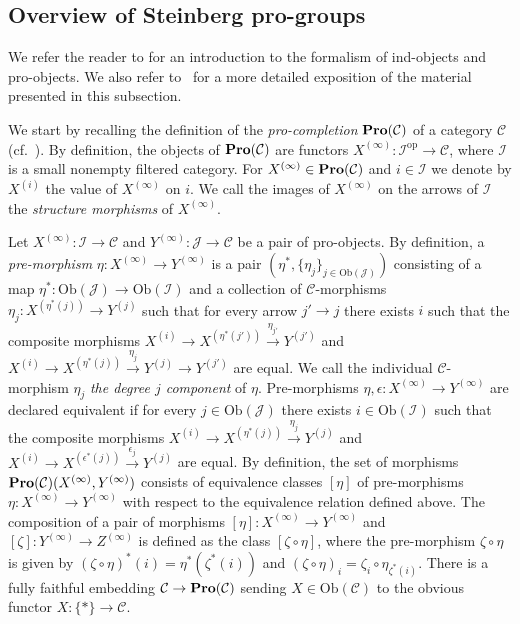 \documentclass[oneside, 11pt]{amsart} \pdfoutput=1
\numberwithin{equation}{section}
\theoremstyle{definition}
\newcommand{\catname}[1]{{\normalfont\textbf{#1}}} %
\begin{document}
\subsection{Overview of Steinberg pro-groups}
We refer the reader to \cite[Section~6.1]{SK06} for an introduction to the formalism of ind-objects and pro-objects. We also refer to~\cite[\S~2]{LSV20} for a more detailed exposition of the material presented in this subsection.

We start by recalling the definition of the {\it pro-completion} $\catname{Pro}(\mathcal{C})$ of a category $\mathcal{C}$ (cf.~\cite[\S~2.1]{LSV20}).
By definition, the objects of $\catname{Pro}(\mathcal{C})$ are functors $X^{(\infty)}\colon\mathcal{I}^{\mathrm{op}} \to \mathcal{C}$, where $\mathcal{I}$ is a small nonempty filtered category. For $X^{(\infty)} \in 
\catname{Pro}(\mathcal{C})$ and $i \in \mathcal{I}$ we denote by $X^{(i)}$ the value of $X^{(\infty)}$ on $i$. 
We call the images of $X^{(\infty)}$ on the arrows of $\mathcal{I}$ the {\it structure morphisms} of $X^{(\infty)}$.

Let $X^{(\infty)}\colon\mathcal{I}\to\mathcal{C}$ and $Y^{(\infty)}\colon\mathcal{J}\to\mathcal{C}$ be a pair of pro-objects.
By definition, a {\it pre-morphism} $\eta\colon X^{(\infty)} \to Y^{(\infty)}$ is a pair $(\eta^*, \{\eta_j\}_{j\in\mathrm{Ob}(\mathcal{J})})$ consisting of a map $\eta^*\colon \mathrm{Ob}(\mathcal{J})\to\mathrm{Ob}(\mathcal{I})$ and a collection of $\mathcal{C}$-morphisms $\eta_j\colon X^{(\eta^*(j))}\to Y^{(j)}$ such that for every arrow $j' \to j$ there exists $i$ such that the composite morphisms $X^{(i)} \to X^{(\eta^*(j'))} \xrightarrow{\eta_{j'}} Y^{(j')}$ and $X^{(i)} \to X^{(\eta^*(j))} \xrightarrow{\eta_j} Y^{(j)} \to Y^{(j')}$ are equal. We call the individual $\mathcal{C}$-morphism $\eta_j$ {\it the degree $j$ component} of $\eta$.
Pre-morphisms $\eta, \epsilon \colon X^{(\infty)} \to Y^{(\infty)}$ are declared equivalent if for every $j \in \mathrm{Ob}(\mathcal{J})$ there exists $i \in \mathrm{Ob}(\mathcal{I})$ such that the composite morphisms $X^{(i)} \to X^{(\eta^*(j))} \xrightarrow{\eta_j} Y^{(j)}$ and $X^{(i)} \to X^{(\epsilon^*(j))} \xrightarrow{\epsilon_j} Y^{(j)}$ are equal. By definition, the set of morphisms $\catname{Pro}(\mathcal{C})(X^{(\infty)}, Y^{(\infty)})$ consists of equivalence classes $[\eta]$ of pre-morphisms $\eta \colon X^{(\infty)} \to Y^{(\infty)}$ with respect to the equivalence relation defined above. The composition of a pair of morphisms \([\eta] \colon X^{(\infty)} \to Y^{(\infty)}\) and \([\zeta] \colon Y^{(\infty)} \to Z^{(\infty)}\) is defined as the class $[\zeta \circ \eta]$, where the pre-morphism \(\zeta \circ \eta\) is given by \((\zeta \circ \eta)^*(i) = \eta^*(\zeta^*(i))\) and \((\zeta\circ \eta)_{i} = \zeta_{i} \circ \eta_{\zeta^*(i)}\). There is a fully faithful embedding $\mathcal{C}\to\catname{Pro}(\mathcal{C})$ sending $X \in \mathrm{Ob}(\mathcal{C})$ to the obvious functor $X\colon \{ * \} \to \mathcal{C}$. 
\end{document}
